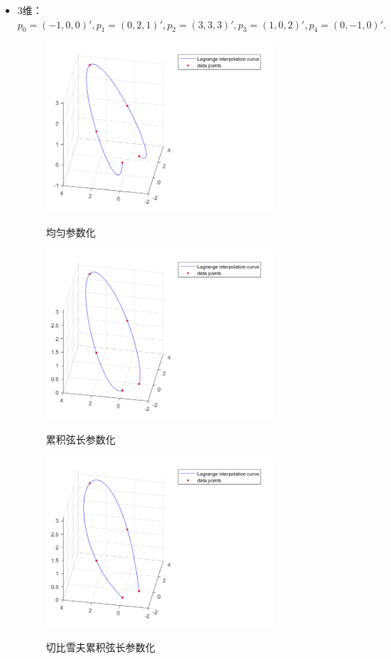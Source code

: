 \documentclass[utf8]{ctexart}
\begin{document}
\begin{itemize}
    \item 3维：$p_0 = (-1,0,0)',
    p_1 = (0,2,1)',
    p_2 = (3,3,3)',
    p_3 = (1,0,2)',
    p_4 = (0,-1,0)'.$
    \begin{figure}[H]
        \centering
        \includegraphics[width=0.8\textwidth]{lagrange_3d_uniform.png}
        \label{fig4}
        \caption{均匀参数化}
    \end{figure}
    \begin{figure}[H]
        \centering
        \includegraphics[width=0.8\textwidth]{lagrange_3d_chord.png}
        \label{fig5}
        \caption{累积弦长参数化}
    \end{figure}
    \begin{figure}[H]
        \centering
        \includegraphics[width=0.8\textwidth]{lagrange_3d_cheby.png}
        \label{fig6}
        \caption{切比雪夫累积弦长参数化}
    \end{figure}
\end{itemize}
\end{document}
